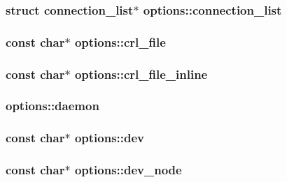 \subsubsection[{connection\+\_\+list}]{\setlength{\rightskip}{0pt plus 5cm}struct {\bf connection\+\_\+list}$\ast$ options\+::connection\+\_\+list}\label{structoptions_a111f57f3a14727b141dc4d359cc02ea2}
\hypertarget{structoptions_a9665bb2a81816f56c43a05593b7cf304}{}
\subsubsection[{crl\+\_\+file}]{\setlength{\rightskip}{0pt plus 5cm}const char$\ast$ options\+::crl\+\_\+file}\label{structoptions_a9665bb2a81816f56c43a05593b7cf304}
\hypertarget{structoptions_acd6451a84c0c4f38ad1a94756941c118}{}
\subsubsection[{crl\+\_\+file\+\_\+inline}]{\setlength{\rightskip}{0pt plus 5cm}const char$\ast$ options\+::crl\+\_\+file\+\_\+inline}\label{structoptions_acd6451a84c0c4f38ad1a94756941c118}
\hypertarget{structoptions_a17176de9689460974a9eb1e7df7fb020}{}
\subsubsection[{daemon}]{ options\+::daemon}\label{structoptions_a17176de9689460974a9eb1e7df7fb020}
\hypertarget{structoptions_af6b62b93b093f8c8a8f0aa326c510c11}{}
\subsubsection[{dev}]{\setlength{\rightskip}{0pt plus 5cm}const char$\ast$ options\+::dev}\label{structoptions_af6b62b93b093f8c8a8f0aa326c510c11}
\hypertarget{structoptions_ad1e91361004780f9f9c8bf2e8d7180f4}{}
\subsubsection[{dev\+\_\+node}]{\setlength{\rightskip}{0pt plus 5cm}const char$\ast$ options\+::dev\+\_\+node}\label{structoptions_ad1e91361004780f9f9c8bf2e8d7180f4}
\hypertarget{structoptions_a46085bfaf25d5996f2f21c7553411a65}{}
